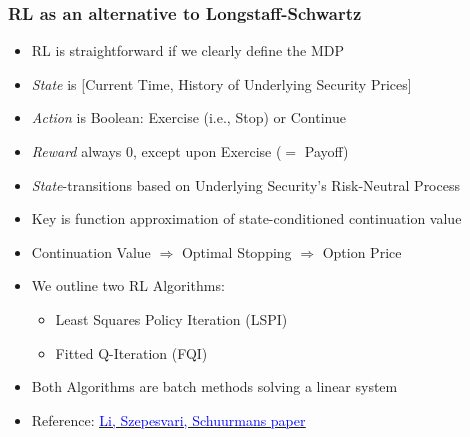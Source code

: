 \documentclass[handout]{beamer}
\begin{document}
\begin{frame}
\frametitle{RL as an alternative to Longstaff-Schwartz}
\pause
\begin{itemize}[<+->]
\item RL is straightforward if we clearly define the MDP
\item {\em State} is [Current Time, History of Underlying Security Prices]
\item {\em Action} is Boolean: Exercise (i.e., Stop) or Continue
\item {\em Reward} always 0, except upon Exercise ($=$ Payoff)
\item {\em State}-transitions based on Underlying Security's Risk-Neutral Process
\item Key is function approximation of state-conditioned continuation value
\item Continuation Value $\Rightarrow$ Optimal Stopping $\Rightarrow$ Option Price
\item We outline two RL Algorithms:
\begin{itemize}
\item Least Squares Policy Iteration (LSPI)
\item Fitted Q-Iteration (FQI)
\end{itemize}
\item Both Algorithms are batch methods solving a linear system
\item Reference: \href{http://proceedings.mlr.press/v5/li09d/li09d.pdf}{\underline{\textcolor{blue}{Li, Szepesvari, Schuurmans paper}}}
\end{itemize}
\end{frame}
\end{document}

